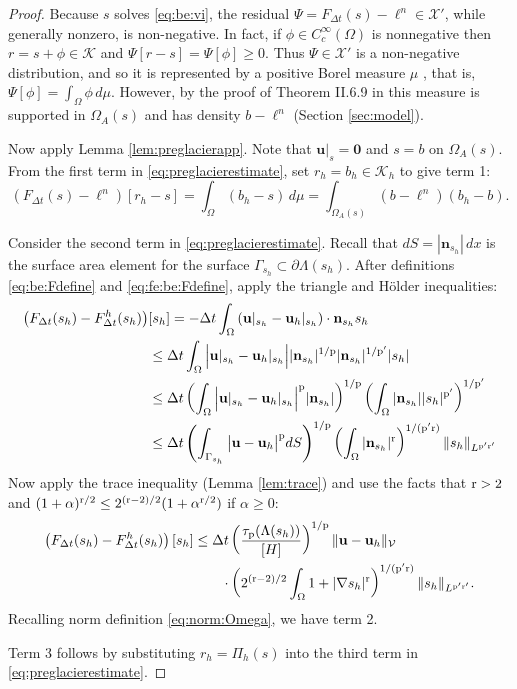 \documentclass[hidelinks,onefignum,onetabnum,final]{siamart220329}  %
\newcommand{\grad}{\nabla}
\newcommand{\bn}{\mathbf{n}}
\newcommand{\bu}{\mathbf{u}}
\newcommand{\bzero}{\bm{0}}
\newcommand{\cK}{\mathcal{K}}
\newcommand{\cV}{\mathcal{V}}
\newcommand{\cX}{\mathcal{X}}
\newcommand{\pp}{{\text{\textnormal{p}}}}
\newcommand{\rr}{{\text{\textnormal{r}}}}
\begin{document}
\begin{proof}  Because $s$ solves \eqref{eq:be:vi}, the residual $\Psi = F_{\Delta t}(s)-\ell^n \in \cX'$, while generally nonzero, is non-negative.  In fact, if $\phi\in C_c^\infty(\Omega)$ is nonnegative then $r=s+\phi \in \cK$ and $\Psi[r-s] = \Psi[\phi] \ge 0$.  Thus $\Psi\in\cX'$ is a non-negative distribution, and so it is represented by a positive Borel measure $\mu$ \cite[Theorem 6.22]{LiebLoss1997}, that is, $\Psi[\phi] = \int_\Omega \phi\,d\mu$.  However, by the proof of Theorem II.6.9 in \cite{KinderlehrerStampacchia1980} this measure is supported in $\Omega_A(s)$ and has density $b-\ell^n$ (Section \ref{sec:model}).

Now apply Lemma \ref{lem:preglacierapp}.  Note that $\bu|_{s}=\bzero$ and $s=b$ on $\Omega_A(s)$.  From the first term in \eqref{eq:preglacierestimate}, set $r_h = b_h \in \cK_h$ to give term 1:
\begin{equation}
\left(F_{\Delta t}(s)-\ell^n\right)[r_h-s] = \int_\Omega (b_h - s) \,d\mu = \int_{\Omega_A(s)} \left(b - \ell^n\right) (b_h - b).
\end{equation}

Consider the second term in \eqref{eq:preglacierestimate}.  Recall that $dS = |\bn_{s_h}|\,dx$ is the surface area element for the surface $\Gamma_{s_h} \subset \partial \Lambda(s_h)$.  After definitions \eqref{eq:be:Fdefine} and \eqref{eq:fe:be:Fdefine}, apply the triangle and H\"older inequalities:
\begin{align}
\left(F_{\Delta t}(s_h)-F^h_{\Delta t}(s_h)\right)&[s_h] = - \Delta t \int_\Omega \left(\bu|_{s_h} - \bu_h|_{s_h}\right)\cdot \bn_{s_h} s_h  \\
  &\le \Delta t \int_\Omega \Big|\bu|_{s_h} - \bu_h|_{s_h}\Big| |\bn_{s_h}|^{1/\pp} |\bn_{s_h}|^{1/\pp'} |s_h| \notag \\
  &\le \Delta t \left(\int_\Omega \Big|\bu|_{s_h} - \bu_h|_{s_h}\Big|^\pp |\bn_{s_h}|\right)^{1/\pp} \left(\int_\Omega |\bn_{s_h}| |s_h|^{\pp'}\right)^{1/\pp'} \notag \\
  &\le \Delta t \left(\int_{\Gamma_{s_h}} \big|\bu - \bu_h\big|^\pp dS\right)^{1/\pp} \left(\int_\Omega |\bn_{s_h}|^\rr\right)^{1/(\pp'\rr)} \|s_h\|_{L^{\pp'\rr'}} \notag
\end{align}
Now apply the trace inequality (Lemma \ref{lem:trace}) and use the facts that $\rr>2$ and $(1+\alpha)^{\rr/2} \le 2^{(\rr-2)/2} (1+\alpha^{\rr/2})$ if $\alpha\ge 0$:
\begin{align}
\left(F_{\Delta t}(s_h)-F^h_{\Delta t}(s_h)\right)[s_h] &\le \Delta t \left(\frac{\tau_\pp(\Lambda(s_h))}{[H]}\right)^{1/\pp} \|\bu - \bu_h\|_{\cV} \\
  &\qquad \cdot \left(2^{(\rr-2)/2} \int_\Omega 1 + |\grad s_h|^\rr\right)^{1/(\pp'\rr)} \|s_h\|_{L^{\pp'\rr'}}.  \notag
\end{align}
Recalling norm definition \eqref{eq:norm:Omega}, we have term 2.

Term 3 follows by substituting $r_h=\Pi_h(s)$ into the third term in \eqref{eq:preglacierestimate}.
\end{proof}
\end{document}
